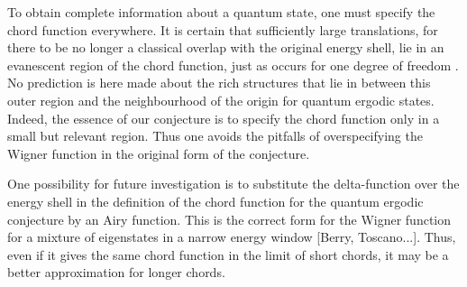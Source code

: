 \documentclass[12pt]{iopart}
\begin{document}
To obtain complete information about a quantum state, one must specify the chord function
everywhere. It is certain that sufficiently large translations, 
for there to be no longer a classical overlap with the original energy shell,
lie in an evanescent region of the chord function, just as occurs for one degree of freedom \cite{ZOA10}.
No prediction is here made about the rich structures that lie in between this outer region and
the neighbourhood of the origin for quantum ergodic states. Indeed, the essence of our conjecture
is to specify the chord function only in a small but relevant region. Thus one avoids the
pitfalls of overspecifying the Wigner function in the original form of the conjecture.

One possibility for future investigation is to substitute the delta-function over the
energy shell in the definition of the chord function for the quantum ergodic conjecture
by an Airy function. This is the correct form for the Wigner function for a mixture of
eigenstates in a narrow energy window [Berry, Toscano...]. Thus, even if it gives the same
chord function in the limit of short chords, it may be a better approximation for longer chords.




\end{document}
